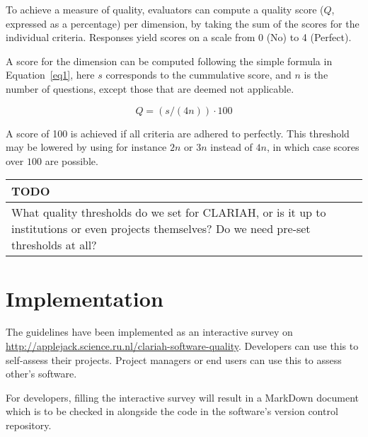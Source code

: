 \documentclass[a4paper,11pt]{article}
\newenvironment{TODO}{
\begin{center}
    \begin{tabular}[h!]{|p{0.8\textwidth}|}
    \hline
    {\bf TODO}\\\hline}
{   \\\hline
    \end{tabular}
\end{center}}
\begin{document}
To achieve a measure of quality, evaluators can compute a quality score ($Q$,
expressed as a percentage) per dimension, by taking the sum of the scores for
the individual criteria. Responses yield scores on a scale from 0 (No) to 4 (Perfect). 

A score for the dimension can be computed following the simple formula in
Equation~\ref{eq1}, here $s$ corresponds to the cummulative score, and $n$ is
the number of questions, except those that are deemed not applicable.

\begin{equation}
\label{eq1}
Q = (s / (4n)) \cdot 100
\end{equation}

A score of 100 is achieved if all criteria are adhered to perfectly. This
threshold may be lowered by using for instance $2n$ or $3n$ instead of $4n$, in
which case scores over $100$ are possible.

\begin{TODO}
What quality thresholds do we set for CLARIAH, or is it up
to institutions or even projects themselves? Do we need pre-set thresholds at
all?
\end{TODO}



\section{Implementation}

The guidelines have been implemented as an interactive survey on
\url{http://applejack.science.ru.nl/clariah-software-quality}. Developers can
use this to self-assess their projects. Project managers or end users can use
this to assess other's software.

For developers, filling the interactive survey will result in a
MarkDown document which is to be checked in alongside the code in the
software's version control repository.


\end{document}
